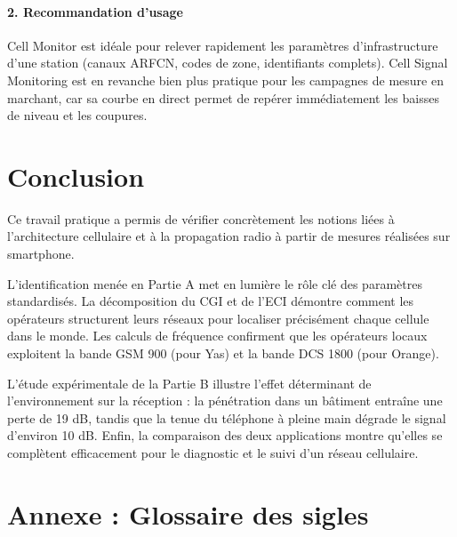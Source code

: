 \documentclass[11pt,a4paper]{article}
\begin{document}
\paragraph{2. Recommandation d'usage}
Cell Monitor est id\'eale pour relever rapidement les param\`etres d'infrastructure d'une station (canaux ARFCN, codes de zone, identifiants complets). Cell Signal Monitoring est en revanche bien plus pratique pour les campagnes de mesure en marchant, car sa courbe en direct permet de rep\'erer imm\'ediatement les baisses de niveau et les coupures.

\section{Conclusion}

Ce travail pratique a permis de v\'erifier concr\`etement les notions li\'ees \`a l'architecture cellulaire et \`a la propagation radio \`a partir de mesures r\'ealis\'ees sur smartphone.

L'identification men\'ee en Partie A met en lumi\`ere le r\^ole cl\'e des param\`etres standardis\'es. La d\'ecomposition du CGI et de l'ECI d\'emontre comment les op\'erateurs structurent leurs r\'eseaux pour localiser pr\'ecis\'ement chaque cellule dans le monde. Les calculs de fr\'equence confirment que les op\'erateurs locaux exploitent la bande GSM 900 (pour Yas) et la bande DCS 1800 (pour Orange).

L'\'etude exp\'erimentale de la Partie B illustre l'effet d\'eterminant de l'environnement sur la r\'eception : la p\'en\'etration dans un b\^atiment entra\^ine une perte de 19 dB, tandis que la tenue du t\'el\'ephone \`a pleine main d\'egrade le signal d'environ 10 dB. Enfin, la comparaison des deux applications montre qu'elles se compl\`etent efficacement pour le diagnostic et le suivi d'un r\'eseau cellulaire.

\newpage
\section*{Annexe : Glossaire des sigles}
\end{document}
